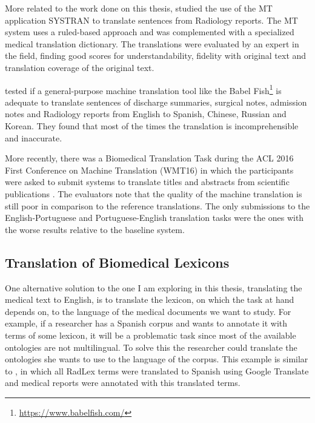 More related to the work done on this thesis, \citep{Castilla2007a} studied the use of the MT application SYSTRAN to translate sentences from Radiology reports. The MT system uses a ruled-based approach and was complemented with a specialized medical translation dictionary. The translations were evaluated by an expert in the field, finding good scores for understandability, fidelity with original text and translation coverage of the original text.

\citep{Zeng-Treitler2010} tested if a general-purpose machine translation tool like the Babel Fish\footnote{\url{https://www.babelfish.com/}} is adequate to translate sentences of discharge summaries, surgical notes, admission notes and Radiology reports from English to Spanish, Chinese, Russian and Korean. They found that most of the times the translation is incomprehensible and inaccurate.

More recently, there was a Biomedical Translation Task during the ACL 2016 First Conference on Machine Translation (WMT16) in which the participants were asked to submit systems to translate titles and abstracts from scientific publications \citep{Bojar2016}. The evaluators note that the quality of the machine translation is still poor in comparison to the reference translations. The only submissions to the English-Portuguese and Portuguese-English translation tasks \citep{Aires2016} were the ones with the worse results relative to the baseline system.

\subsection{Translation of Biomedical Lexicons}

One alternative solution to the one I am exploring in this thesis, translating the medical text to English, is to translate the lexicon, on which the task at hand depends on, to the language of the medical documents we want to study. For example, if a researcher has a Spanish corpus and wants to annotate it with terms of some lexicon, it will be a problematic task since most of the available ontologies are not multilingual. To solve this the researcher could translate the ontologies she wants to use to the language of the corpus. This example is similar to \citep{Cotik2015}, in which all RadLex terms were translated to Spanish using Google Translate and medical reports were annotated with this translated terms. 

